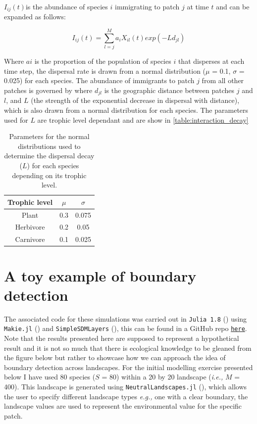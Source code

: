 \begin{refsection}
$I_{ij}(t) $is the abundance of species $i$ immigrating to patch $j$ at time $t$
and can be expanded as follows:

\begin{equation} \label{eq:metacomm_imm}
I_{ij}(t)=\sum_{l=j}^{M}a_iX_{il}(t)exp(-Ld_{jl})
\end{equation}

Where $ai$ is the proportion of the population of species $i$ that disperses at each time step, the dispersal rate is drawn from a normal distribution ($\mu$ = 0.1, $\sigma$ = 0.025) for each species. The abundance of immigrants to patch $j$ from all other patches is governed by where $d_{jl}$ is the geographic distance between patches $j$ and $l$, and $L$ (the strength of the exponential decrease in dispersal with distance), which is also drawn from a normal distribution for each species. The parameters used for $L$ are trophic level dependant and are show in \autoref{table:interaction_decay}

\begin{table}[h!]
\centering
\begin{tabular}{||c c c||} 
 \hline
Trophic level & $\mu$ & $\sigma$ \\ [0.5ex] \hline\hline
 Plant & 0.3 & 0.075 \\ 
 Herbivore & 0.2 & 0.05 \\
 Carnivore & 0.1 & 0.025 \\ [1ex] 
 \hline
\end{tabular}
\caption{Parameters for the normal distributions used to determine the dispersal
decay ($L$) for each species depending on its trophic level.}
\label{table:interaction_decay}
\end{table}

\section{A toy example of boundary detection}

The associated code for these simulations was carried out in \texttt{Julia 1.8} (\cite{Bezanson2017Julia}) using \texttt{Makie.jl} (\cite{Danisch2021Makie}) and \texttt{SimpleSDMLayers} (\cite{Dansereau2021Simplesdmlayers}), this can be found in a GitHub repo \href{https://github.com/PoisotLab/Omnomnomivores}{\texttt{here}}. Note that the results presented here are supposed to represent a hypothetical result and it is not so much that there is ecological knowledge to be gleaned from the figure below but rather to showcase how we can approach the idea of boundary detection across landscapes. For the initial modelling exercise presented below I have used 80 species ($S$ = 80) within a 20 by 20 landscape (\emph{i.e.,} $M$ = 400). This landscape is generated using \texttt{NeutralLandscapes.jl} (\cite{2023Neutral}), which allows the user to specify different landscape types \emph{e.g.,} one with a clear boundary, the landscape values are used to represent the environmental value for the specific patch.


\end{refsection}
